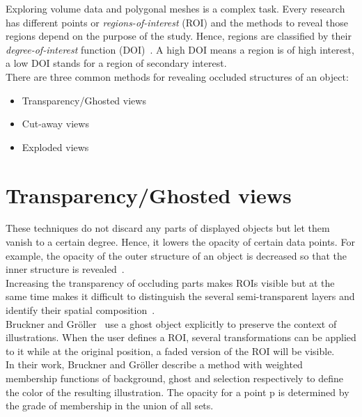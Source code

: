 
Exploring volume data and polygonal meshes is a complex task. Every research has different points or \emph{regions-of-interest} (ROI) and the methods to reveal those regions depend on the purpose of the study. Hence, regions are classified by their \emph{degree-of-interest} function (DOI)~\cite{proc:intelligentCutaway}. A high DOI means a region is of high interest, a low DOI stands for a region of secondary interest.\\
There are three common methods for revealing occluded structures of an object:
\begin{itemize}
	\item Transparency/Ghosted views
	\item Cut-away views
	\item Exploded views
\end{itemize}

\section{Transparency/Ghosted views}
These techniques do not discard any parts of displayed objects but let them vanish to a certain degree. Hence, it lowers the opacity of certain data points. For example, the opacity of the outer structure of an object is decreased so that the inner structure is revealed~\cite{jour:correa}.\\
Increasing the transparency of occluding parts makes ROIs visible but at the same time makes it difficult to distinguish the several semi-transparent layers and identify their spatial composition~\cite{jour:interactiveCutaway}.\\
Bruckner and Gr{\"o}ller~\cite{proc:volumeshop} use a ghost object explicitly to preserve the context of illustrations. When the user defines a ROI, several transformations can be applied to it while at the original position, a faded version of the ROI will be visible.\\
In their work, Bruckner and Gr{\"o}ller describe a method with weighted membership functions of background, ghost and selection respectively to define the color of the resulting illustration. The opacity for a point p is determined by the grade of membership in the union of all sets.

